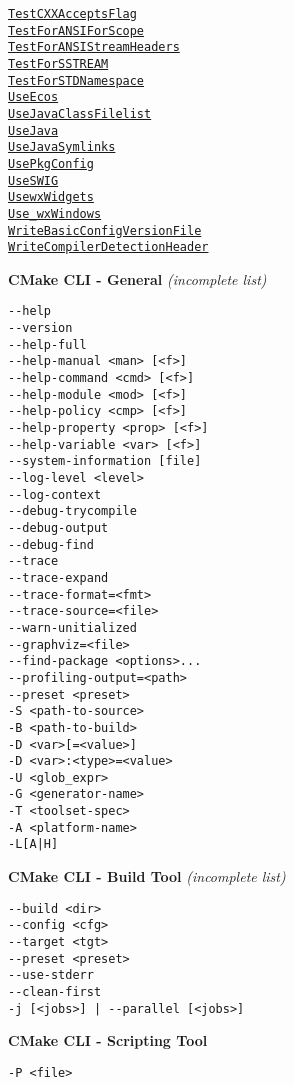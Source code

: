 \documentclass{article}
\newcommand{\cmakemodule}[1]{{\href{https://cmake.org/cmake/help/v3.20/module/#1.html}{{\lstinline{#1}}}}}
\begin{document}
\begin{minipage}[t]{0.18\linewidth}
\cmakemodule{TestCXXAcceptsFlag}\\
\cmakemodule{TestForANSIForScope}\\
\cmakemodule{TestForANSIStreamHeaders}\\
\cmakemodule{TestForSSTREAM}\\
\cmakemodule{TestForSTDNamespace}\\
\cmakemodule{UseEcos}\\
\cmakemodule{UseJavaClassFilelist}\\
\cmakemodule{UseJava}\\
\cmakemodule{UseJavaSymlinks}\\
\cmakemodule{UsePkgConfig}\\
\cmakemodule{UseSWIG}\\
\cmakemodule{UsewxWidgets}\\
\cmakemodule{Use_wxWindows}\\
\cmakemodule{WriteBasicConfigVersionFile}\\
\cmakemodule{WriteCompilerDetectionHeader}\\
\end{minipage}
\hfill\vline\hfill
\begin{minipage}[t]{0.18\linewidth}
\textbf{CMake CLI - General}
{\tiny \em (incomplete list)}
\begin{verbatim}
--help
--version
--help-full
--help-manual <man> [<f>]
--help-command <cmd> [<f>]
--help-module <mod> [<f>]
--help-policy <cmp> [<f>]
--help-property <prop> [<f>]
--help-variable <var> [<f>]
--system-information [file]
--log-level <level>
--log-context
--debug-trycompile
--debug-output
--debug-find
--trace
--trace-expand
--trace-format=<fmt>
--trace-source=<file>
--warn-unitialized
--graphviz=<file>
--find-package <options>...
--profiling-output=<path>
--preset <preset>
-S <path-to-source>
-B <path-to-build>
-D <var>[=<value>]
-D <var>:<type>=<value>
-U <glob_expr>
-G <generator-name>
-T <toolset-spec>
-A <platform-name>
-L[A|H]
\end{verbatim}
\textbf{CMake CLI - Build Tool}
{\tiny \em (incomplete list)}
\begin{verbatim}
--build <dir>
--config <cfg>
--target <tgt>
--preset <preset>
--use-stderr
--clean-first
-j [<jobs>] | --parallel [<jobs>]
\end{verbatim}
\textbf{CMake CLI - Scripting Tool}
\begin{verbatim}
-P <file>
\end{verbatim}
\hfill\vline\hfill
\end{minipage}
\hfill\vline\hfill
\end{document}
